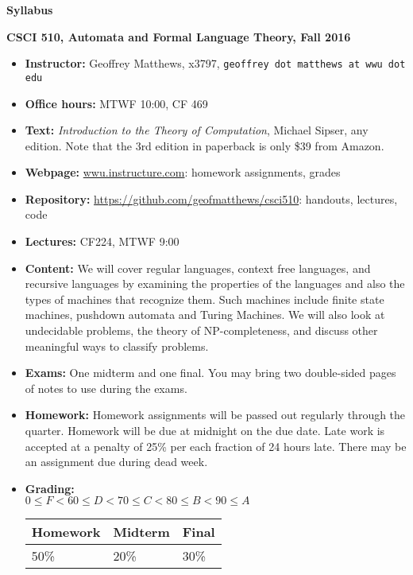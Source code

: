 \documentclass{article}
\begin{document}
\centerline{\large \bf Syllabus}

\centerline{\bf CSCI 510, Automata and Formal Language Theory, Fall 2016}

\begin{itemize}

\item
{\bf Instructor:} Geoffrey Matthews, x3797, {\tt  geoffrey dot matthews at wwu dot edu}
\item
{\bf Office hours:} MTWF 10:00, CF 469
\item
{\bf Text:} 
{\em  Introduction to the Theory of Computation}, Michael Sipser, any edition.
  Note that the 3rd edition in paperback is only \$39 from Amazon.

\item {\bf Webpage:}  \url{wwu.instructure.com}:  homework assignments, grades
\item {\bf Repository:} \url{https://github.com/geofmatthews/csci510}:  handouts, lectures, code
\item
{\bf Lectures:} 
CF224, MTWF 9:00

\item
  {\bf Content:} We will cover regular languages, context free languages,
  and recursive languages by examining the properties of the languages
  and also the types of machines that recognize them.  Such machines
  include finite state machines, pushdown automata and Turing
  Machines.  We will also look at undecidable problems, the theory of
  NP-completeness, and discuss other meaningful ways to classify
  problems. 

\item {\bf Exams:} One midterm and one final.  You may bring two
  double-sided pages of notes to use during the exams.


\item {\bf Homework:} Homework assignments will be passed out
  regularly through the quarter.  Homework will be due at midnight on
  the due date.  Late work is accepted at a penalty of 25\% per each
  fraction of 24 hours late.  There may be an assignment due during
  dead week.


\item {\bf Grading:} \\
$0\leq F < 60 \leq D < 70 \leq C < 80 \leq B < 90 \leq A$\hfill
\begin{tabular}{|l|l|l|}\hline
Homework  & Midterm & Final\\\hline
50\% & 20\% & 30\%\\\hline
\end{tabular}


\end{itemize}
\end{document}
